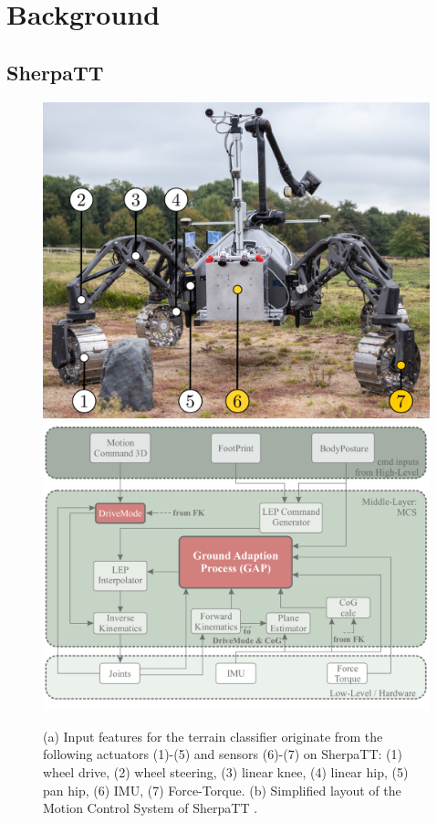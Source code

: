 \section{Background}


\subsection{SherpaTT}

\begin{figure}[!htbp]
       {
           \includegraphics[width=0.9\columnwidth]{../figures/terrain_classifier_sensor_inputs.png}
       }
   \qquad \qquad
       {
           \includegraphics[width=\columnwidth]{../figures/MCS-Structure.png}
       }
   \caption{\label{fig:Loco}(a) Input features for the terrain classifier originate from the following actuators (1)-(5) and sensors (6)-(7) on SherpaTT: (1) wheel drive, (2) wheel steering, (3) linear knee, (4) linear hip, (5) pan hip, (6) IMU, (7) Force-Torque. (b) Simplified layout of the Motion Control System of SherpaTT \citep{cordes_phd_2018}.}
\end{figure}

